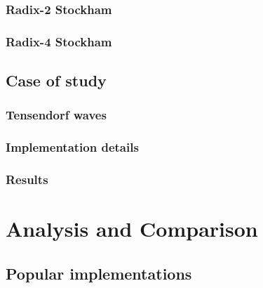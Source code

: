 \documentclass[
  oneside,
  11pt, a4paper,
  footinclude=true,
  headinclude=true,
  cleardoublepage=empty
]{scrbook}
\begin{document}
\subsection{Radix-2 Stockham}

\subsection{Radix-4 Stockham}




\section{Case of study}
\subsection{Tensendorf waves}


\subsection{Implementation details}
\subsection{Results}

\chapter{Analysis and Comparison}
\section{Popular implementations}
\end{document}
